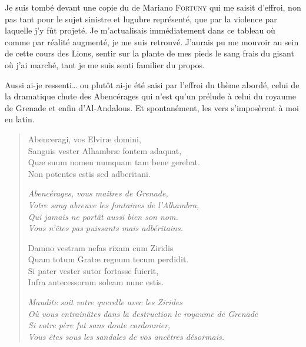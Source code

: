 \begin{prose}
Je suis tombé devant une copie du  de Mariano \textsc{Fortuny} qui me saisit d’effroi, non pas tant pour le sujet sinistre et lugubre représenté, que par la violence par laquelle j’y fût projeté. Je m’actualisais immédiatement dans ce tableau où comme par réalité augmenté, je me suis retrouvé. J’aurais pu me mouvoir au sein de cette cours des Lions, sentir sur la plante de mes pieds le sang frais du gisant où j’ai marché, tant je me suis senti familier du propos.

Aussi ai-je ressenti… ou plutôt ai-je été saisi par l’effroi du thème abordé, celui de la dramatique chute des Abencérages qui n’est qu’un prélude à celui du royaume de Grenade et enfin d’Al-Andalous. Et spontanément, les vers s’imposèrent à moi en latin.
\end{prose}
\setlength\LTleft{-1.7cm}%
\begin{verse}
Abenceragi, vos Elviræ domini,           \\
Sanguis vester Alhambræ fontem adaquat,  \\
Quæ suum nomen numquam tam bene gerebat. \\
Non potentes estis sed adberitani.       

\emph{Abencérages, vous maitres de Grenade,}\\
\emph{Votre sang abreuve les fontaines de l’Alhambra,}\\
\emph{Qui jamais ne portât aussi bien son nom.}\\
\emph{Vous n’êtes pas puissants mais adbéritains.}

Damno vestram nefas rixam cum Ziridis   \\
Quam totum Gratæ regnum tecum perdidit. \\
Si pater vester sutor fortasse fuierit, \\
Infra antecessorum soleam nunc estis.   

\emph{Maudite soit votre querelle avec les Zirides}\\
\emph{Où vous entrainâtes dans la destruction le royaume de Grenade}\\
\emph{Si votre père fut sans doute cordonnier,}\\
\emph{Vous êtes sous les sandales de vos ancêtres désormais.}
\end{verse}

